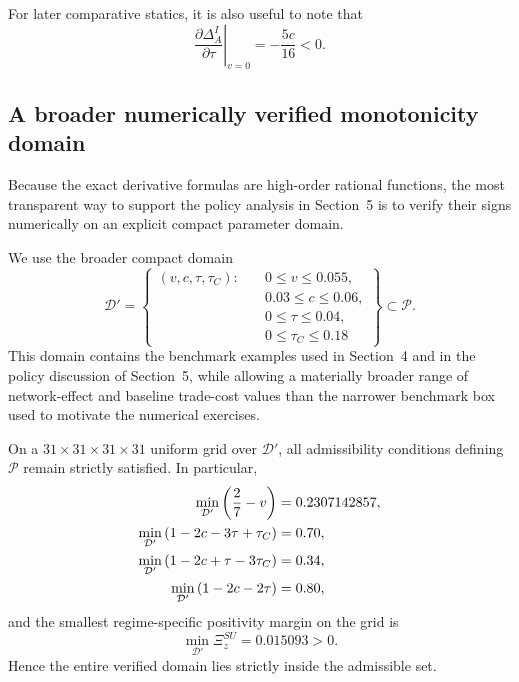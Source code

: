 For later comparative statics, it is also useful to note that
\begin{equation}
\left.\frac{\partial \Delta_A^I}{\partial \tau}\right|_{v=0}
= -\frac{5c}{16}<0.
\label{eq:dAI_tau_v0_final}
\end{equation}

\subsection{A broader numerically verified monotonicity domain}

Because the exact derivative formulas are high-order rational functions, the
most transparent way to support the policy analysis in Section~5 is to verify
their signs numerically on an explicit compact parameter domain.

We use the broader compact domain
\begin{equation}
\mathcal D'
=
\left\{
\begin{aligned}
(v,c,\tau,\tau_C):\quad &0 \le v \le 0.055,\\
&0.03 \le c \le 0.06,\\
&0 \le \tau \le 0.04,\\
&0 \le \tau_C \le 0.18
\end{aligned}
\right\}
\subset \mathcal P.
\label{eq:domain_D}
\end{equation}
This domain contains the benchmark examples used in Section~4 and in the
policy discussion of Section~5, while allowing a materially broader range of
network-effect and baseline trade-cost values than the narrower benchmark box
used to motivate the numerical exercises.

On a $31\times 31\times 31\times 31$ uniform grid over $\mathcal D'$, all
admissibility conditions defining $\mathcal P$ remain strictly satisfied. In
particular,
\begin{align}
\min_{\mathcal D'}\left(\frac{2}{7}-v\right) &= 0.2307142857, \notag\\
\min_{\mathcal D'}\left(1-2c-3\tau+\tau_C\right) &= 0.70, \notag\\
\min_{\mathcal D'}\left(1-2c+\tau-3\tau_C\right) &= 0.34, \notag\\
\min_{\mathcal D'}\left(1-2c-2\tau\right) &= 0.80, \label{eq:D_admissibility_margins}
\end{align}
and the smallest regime-specific positivity margin on the grid is
\begin{equation}
\min_{\mathcal D'}\Xi_z^{SU}=0.015093>0.
\label{eq:D_smallest_margin}
\end{equation}
Hence the entire verified domain lies strictly inside the admissible set.

